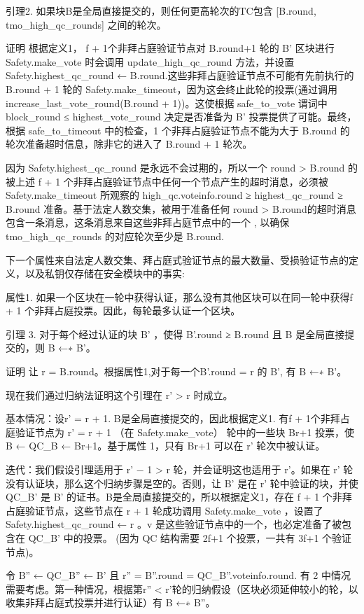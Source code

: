 引理2. 如果块B是全局直接提交的，则任何更高轮次的TC包含 [B.round, tmo\_high\_qc\_rounds] 之间的轮次。

证明 根据定义1， f + 1个非拜占庭验证节点对 B.round+1 轮的 B' 区块进行 Safety.make\_vote 时会调用 update\_high\_qc\_round 方法，并设置 Safety.highest\_qc\_round ← B.round.这些非拜占庭验证节点不可能有先前执行的 B.round + 1 轮的 Safety.make\_timeout，因为这会终止此轮的投票(通过调用 increase\_last\_vote\_round(B.round + 1))。这使根据 safe\_to\_vote 谓词中 block\_round ≤ highest\_vote\_round 决定是否准备为 B' 投票提供了可能。最终，根据 safe\_to\_timeout 中的检查，1 个非拜占庭验证节点不能为大于 B.round 的轮次准备超时信息，除非它的进入了 B.round + 1 轮次。

因为 Safety.highest\_qc\_round 是永远不会过期的，所以一个 round > B.round 的被上述 f + 1 个非拜占庭验证节点中任何一个节点产生的超时消息，必须被 Safety.make\_timeout 所观察的 high\_qc.voteinfo.round ≥ highest\_qc\_round ≥ B.round 准备。基于法定人数交集，被用于准备任何 round > B.round的超时消息包含一条消息，这条消息来自这些非拜占庭节点中的一个 , 以确保 tmo\_high\_qc\_rounds 的对应轮次至少是 B.round.

下一个属性来自法定人数交集、拜占庭式验证节点的最大数量、受损验证节点的定义，以及私钥仅存储在安全模块中的事实:

属性1.  如果一个区块在一轮中获得认证，那么没有其他区块可以在同一轮中获得f + 1  个非拜占庭投票。因此，每轮最多认证一个区块。

引理 3. 对于每个经过认证的块 B' ，使得 B'.round ≥ B.round 且 B 是全局直接提交的，则 B ←∗ B'。

证明 让 r = B.round。根据属性1,对于每一个B'.round = r 的 B', 有 B ←∗ B'。

现在我们通过归纳法证明这个引理在 r' > r 时成立。

基本情况：设r' = r + 1.  B是全局直接提交的，因此根据定义1. 有f + 1个非拜占庭验证节点为 r' = r + 1 （在 Safety.make\_vote） 轮中的一些块 Br+1 投票，使 B ← QC\_B ← Br+1。基于属性 1，只有 Br+1 可以在 r' 轮次中被认证。

迭代：我们假设引理适用于 r' − 1 > r 轮，并会证明这也适用于 r'。如果在 r' 轮没有认证块，那么这个归纳步骤是空的。否则，让 B' 是在 r' 轮中验证的块，并使 QC\_B' 是 B' 的证书。B是全局直接提交的，所以根据定义1，存在 f + 1 个非拜占庭验证节点，这些节点在 r + 1 轮成功调用 Safety.make\_vote ，设置了 Safety.highest\_qc\_round ← r 。v 是这些验证节点中的一个，也必定准备了被包含在 QC\_B' 中的投票。 (因为 QC 结构需要 2f+1 个投票，一共有 3f+1 个验证节点)。

令 B'' ← QC\_B'' ← B' 且 r'' = B''.round = QC\_B''.voteinfo.round. 有 2 中情况需要考虑。第一种情况，根据第r'' < r'轮的归纳假设（区块必须延伸较小的轮，以收集非拜占庭式投票并进行认证）有  B ←∗ B''。

